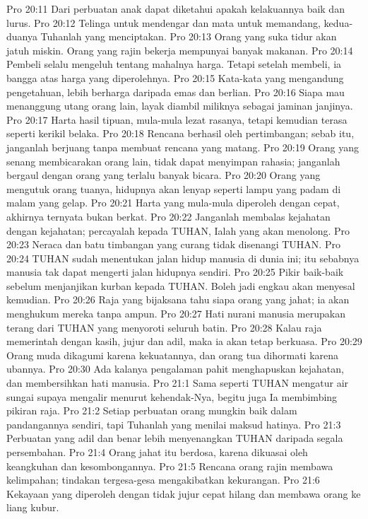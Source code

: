 Pro 20:11  Dari perbuatan anak dapat diketahui apakah kelakuannya baik dan lurus.
Pro 20:12  Telinga untuk mendengar dan mata untuk memandang, kedua-duanya Tuhanlah yang menciptakan.
Pro 20:13  Orang yang suka tidur akan jatuh miskin. Orang yang rajin bekerja mempunyai banyak makanan.
Pro 20:14  Pembeli selalu mengeluh tentang mahalnya harga. Tetapi setelah membeli, ia bangga atas harga yang diperolehnya.
Pro 20:15  Kata-kata yang mengandung pengetahuan, lebih berharga daripada emas dan berlian.
Pro 20:16  Siapa mau menanggung utang orang lain, layak diambil miliknya sebagai jaminan janjinya.
Pro 20:17  Harta hasil tipuan, mula-mula lezat rasanya, tetapi kemudian terasa seperti kerikil belaka.
Pro 20:18  Rencana berhasil oleh pertimbangan; sebab itu, janganlah berjuang tanpa membuat rencana yang matang.
Pro 20:19  Orang yang senang membicarakan orang lain, tidak dapat menyimpan rahasia; janganlah bergaul dengan orang yang terlalu banyak bicara.
Pro 20:20  Orang yang mengutuk orang tuanya, hidupnya akan lenyap seperti lampu yang padam di malam yang gelap.
Pro 20:21  Harta yang mula-mula diperoleh dengan cepat, akhirnya ternyata bukan berkat.
Pro 20:22  Janganlah membalas kejahatan dengan kejahatan; percayalah kepada TUHAN, Ialah yang akan menolong.
Pro 20:23  Neraca dan batu timbangan yang curang tidak disenangi TUHAN.
Pro 20:24  TUHAN sudah menentukan jalan hidup manusia di dunia ini; itu sebabnya manusia tak dapat mengerti jalan hidupnya sendiri.
Pro 20:25  Pikir baik-baik sebelum menjanjikan kurban kepada TUHAN. Boleh jadi engkau akan menyesal kemudian.
Pro 20:26  Raja yang bijaksana tahu siapa orang yang jahat; ia akan menghukum mereka tanpa ampun.
Pro 20:27  Hati nurani manusia merupakan terang dari TUHAN yang menyoroti seluruh batin.
Pro 20:28  Kalau raja memerintah dengan kasih, jujur dan adil, maka ia akan tetap berkuasa.
Pro 20:29  Orang muda dikagumi karena kekuatannya, dan orang tua dihormati karena ubannya.
Pro 20:30  Ada kalanya pengalaman pahit menghapuskan kejahatan, dan membersihkan hati manusia.
Pro 21:1  Sama seperti TUHAN mengatur air sungai supaya mengalir menurut kehendak-Nya, begitu juga Ia membimbing pikiran raja.
Pro 21:2  Setiap perbuatan orang mungkin baik dalam pandangannya sendiri, tapi Tuhanlah yang menilai maksud hatinya.
Pro 21:3  Perbuatan yang adil dan benar lebih menyenangkan TUHAN daripada segala persembahan.
Pro 21:4  Orang jahat itu berdosa, karena dikuasai oleh keangkuhan dan kesombongannya.
Pro 21:5  Rencana orang rajin membawa kelimpahan; tindakan tergesa-gesa mengakibatkan kekurangan.
Pro 21:6  Kekayaan yang diperoleh dengan tidak jujur cepat hilang dan membawa orang ke liang kubur.
